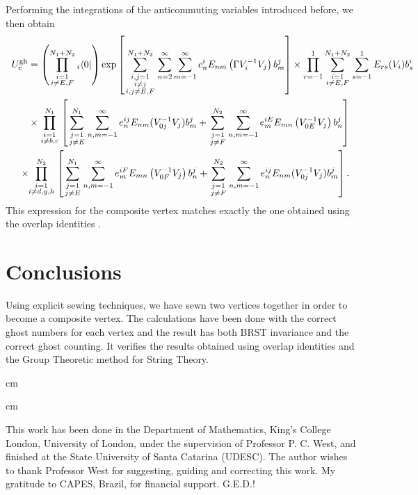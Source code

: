 \documentclass[a4paper,11pt]{article}
\begin{document}
Performing the integrations of the anticommuting variables introduced before, we then obtain
\begin{eqnarray}
\lefteqn{U^{\rm gh}_c=\left( \prod_{\scriptstyle i=1\atop \scriptstyle i\neq E,F}^{N_1+N_2}{ }_i\langle 0|\right) \exp \left[ \sum_{{\scriptstyle i,j=1\atop \scriptstyle i\neq j}\atop \scriptstyle i,j\neq E,F}^{N_1+N_2}\sum_{n=2}^\infty \sum_{m=-1}^\infty c_n^iE_{nm}\left( \Gamma V^{-1}_iV_j\right) b_m^j\right] \times \prod_{r=-1}^1\sum_{\scriptstyle i=1\atop \scriptstyle i\neq E,F}^{N_1+N_2}\sum_{s=-1}^1E_{rs}(V_i)b_s^i}\nonumber \\ 
 & & \times \prod_{\scriptstyle i=1\atop \scriptstyle i\neq b,c}^{N_1}\left[ \sum_{\scriptstyle j=1\atop \scriptstyle j\neq E}^{N_1}\sum_{n,m=-1}^\infty e_n^{ij}E_{nm}(V_{0j}^{-1}V_j)b_m^j+\sum_{\scriptstyle j=1\atop \scriptstyle j\neq F}^{N_2}\sum_{n,m=-1}^\infty e_m^{iE}E_{mn}\left( V_{0E}^{-1}V_j\right) b_n^j\right] \nonumber \\ 
 & & \times \! \! \prod_{\scriptstyle i=1\atop \scriptstyle i\neq d,g,h}^{N_2}\left[ \sum_{\scriptstyle j=1\atop \scriptstyle j\neq E}^{N_1}\sum_{n,m=-1}^\infty e_m^{iF}E_{mn}\left( V_{0F}^{-1}V_j\right) b_n^j+\sum_{\scriptstyle j=1\atop \scriptstyle j\neq F}^{N_2}\sum_{n,m=-1}^\infty e_n^{ij}E_{nm}(V_{0j}^{-1}V_j)b_m^j\right] .
\end{eqnarray}
This expression for the composite vertex matches exactly the one obtained using the overlap identities \cite{ls1}.

\section{Conclusions}

Using explicit sewing techniques, we have sewn two vertices together in order to become a composite vertex. The calculations have been done with the correct ghost numbers for each vertex and the result has both BRST invariance and the correct ghost counting. It verifies the results obtained using overlap identities and the Group Theoretic method for String Theory.

 cm


 cm

This work has been done in the Department of Mathematics, King's College London, University of London, under the supervision of Professor P. C. West, and finished at the State University of Santa Catarina (UDESC). The author wishes to thank Professor West for suggesting, guiding and correcting this work. My gratitude to CAPES, Brazil, for financial support. G.E.D.!
\end{document}
